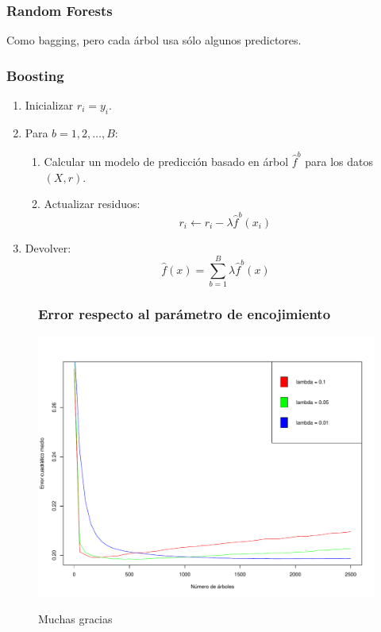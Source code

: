 \documentclass{beamer}
\theoremstyle{definition}
\begin{document}
\begin{frame}
\frametitle{Random Forests}
Como bagging, pero cada árbol usa sólo algunos predictores.
\end{frame}

\begin{frame}
\frametitle{Boosting}
\begin{enumerate}
	\item<1-> Inicializar $r_i = y_i$.
	\item<2-> Para $b=1,2,\dots,B$:
	\begin{enumerate}
		\item Calcular un modelo de predicción basado en árbol $\widehat{f}^b$ para los datos $(X,r)$.
		\item Actualizar residuos:
		\[ r_i \leftarrow r_i - \lambda \widehat{f}^b(x_i) \]
	\end{enumerate}
	\item<3-> Devolver:
	\[ \widehat{f}(x) = \sum_{b=1}^B \lambda \widehat{f}^b(x) \]
\end{enumerate}
\end{frame}

\begin{frame}
\begin{figure}[h!]
\frametitle{Error respecto al parámetro de encojimiento}

\includegraphics[scale=0.28]{shrinking}
\end{figure}
\end{frame}


\begin{frame}
\begin{figure}[h!]
Muchas gracias
\end{figure}
\end{frame}
\end{document}
